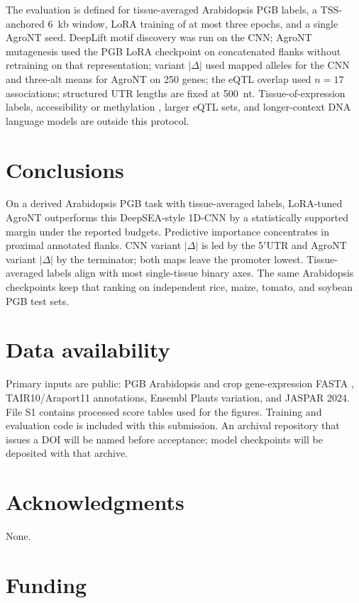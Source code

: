 \documentclass[11pt]{article}
\begin{document}
The evaluation is defined for tissue-averaged Arabidopsis PGB labels, a TSS-anchored 6~kb window, LoRA training of at most three epochs, and a single AgroNT seed. DeepLift motif discovery was run on the CNN; AgroNT mutagenesis used the PGB LoRA checkpoint on concatenated flanks without retraining on that representation; variant $|\Delta|$ used mapped alleles for the CNN and three-alt means for AgroNT on 250 genes; the eQTL overlap used $n=17$ associations; structured UTR lengths are fixed at 500~nt. Tissue-of-expression labels, accessibility or methylation \citep{omalley2016,takou2025}, larger eQTL sets, and longer-context DNA language models \citep{avsec2021} are outside this protocol.

\section{Conclusions}

On a derived Arabidopsis PGB task with tissue-averaged labels, LoRA-tuned AgroNT outperforms this DeepSEA-style 1D-CNN by a statistically supported margin under the reported budgets. Predictive importance concentrates in proximal annotated flanks. CNN variant $|\Delta|$ is led by the 5$'$UTR and AgroNT variant $|\Delta|$ by the terminator; both maps leave the promoter lowest. Tissue-averaged labels align with most single-tissue binary axes. The same Arabidopsis checkpoints keep that ranking on independent rice, maize, tomato, and soybean PGB test sets.

\section*{Data availability}

Primary inputs are public: PGB Arabidopsis and crop gene-expression FASTA \citep{pgb2024}, TAIR10/Araport11 annotations, Ensembl Plants variation, and JASPAR 2024. File S1 contains processed score tables used for the figures. Training and evaluation code is included with this submission. An archival repository that issues a DOI will be named before acceptance; model checkpoints will be deposited with that archive.

\section*{Acknowledgments}

None.

\section*{Funding}
\end{document}
